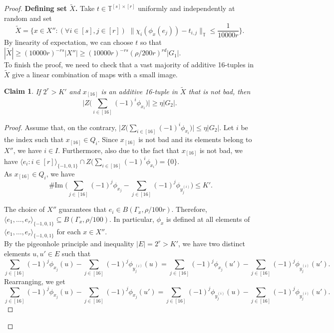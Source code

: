\documentclass[a4paper,11pt]{article}
\numberwithin{theorem}{section}
\newtheorem{claim}[theorem]{Claim}
\theoremstyle{definition}
\newcommand{\on}[1]{
	\operatorname{#1}
}
\newcommand{\uc}[1]{
    \|#1\|_{\mathbb{T}}
}
\newcommand\range{\on{\# Im}}
\begin{document}
\begin{proof}
    \noindent\textbf{Defining set $\tilde{X}$.} Take $t \in \mathbb{T}^{[s] \times [r]}$ uniformly and independently at random and set 
    \[\tilde{X} = \Big\{x \in X'' : (\forall i \in [s], j \in [r])\,\,\uc{\chi_i(\phi_x(e_{j})) - t_{i,j}} \leq \frac{1}{10000 r}\Big\}.\]
    By linearity of expectation, we can choose $t$ so that $|\tilde{X}| \geq (10000r)^{-rs} |X''| \geq (10000r)^{-rs}(\rho/200r)^{r d} |G_1|$.\\
    \indent To finish the proof, we need to check that a vast majority of additive 16-tuples in $\tilde{X}$ give a linear combination of maps with a small image.

    \begin{claim}
        If $2^r > K'$ and $x_{[16]}$ is an additive 16-tuple in $\tilde{X}$ that is not bad, then
        \[\Big|Z\Big(\sum_{i \in [16]} (-1)^i\phi_{x_i}\Big)\Big| \geq \eta |G_2| .\]
    \end{claim}

    \begin{proof}
        Assume that, on the contrary, $\Big|Z\Big(\sum_{i \in [16]} (-1)^i\phi_{x_i}\Big)\Big| \leq \eta |G_2|$. Let $i$ be the index such that $x_{[16]} \in Q_i$. Since $x_{[16]}$ is not bad and its elements belong to $X''$, we have $i \in I$. Furthermore, also due to the fact that $x_{[16]}$ is not bad, we have $\langle e_{i} : i \in [r]\rangle_{\{-1,0,1\}} \cap Z\Big(\sum_{i \in [16]} (-1)^i\phi_{x_i}\Big) = \{0\}$.\\
        \indent As $x_{[16]} \in Q_i$, we have 
        \[\range\Big(\sum_{j \in [16]} (-1)^j \phi_{x_j} - \sum_{j \in [16]} (-1)^j \phi_{y^{(i)}_j}\Big) \leq K'.\]

        The choice of $X''$ guarantees that $e_i \in B(\Gamma_x, \rho/100r)$. Therefore, $\langle e_1,\dots, e_r\rangle_{\{-1,0,1\}} \subseteq B(\Gamma_x, \rho/100)$. In particular, $\phi_x$ is defined at all elements of $\langle e_1,\dots, e_r\rangle_{\{-1,0,1\}}$ for each $x \in X''$.\\
        
        By the pigeonhole principle and inequality $|E| = 2^r > K'$, we have two distinct elements $u, u' \in E$ such that 
        \[\sum_{j \in [16]} (-1)^j \phi_{x_j}(u) - \sum_{j \in [16]} (-1)^j \phi_{y^{(i)}_j}(u) = \sum_{j \in [16]} (-1)^j \phi_{x_j}(u') - \sum_{j \in [16]} (-1)^j \phi_{y^{(i)}_j}(u').\]
        Rearranging, we get
        \[\sum_{j \in [16]} (-1)^j \phi_{x_j}(u) - \sum_{j \in [16]} (-1)^j \phi_{x_j}(u')  = \sum_{j \in [16]} (-1)^j \phi_{y^{(i)}_j}(u) - \sum_{j \in [16]} (-1)^j \phi_{y^{(i)}_j}(u').\]
        

\end{proof}
\end{proof}
\end{document}
